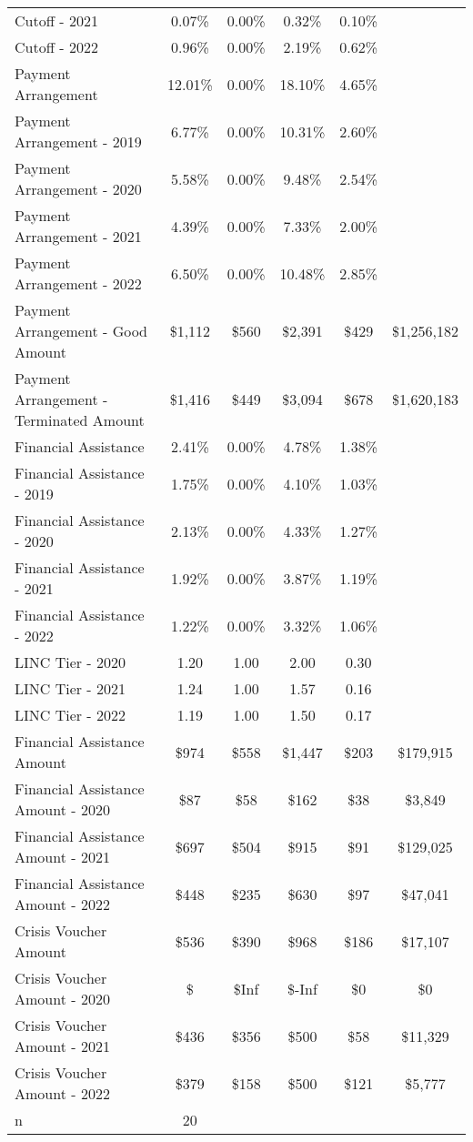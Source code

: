 \begin{tabular}{l|c|c|c|c|c}
\quad Cutoff - 2021 & 0.07\% & 0.00\% & 0.32\% & 0.10\% \\
\quad Cutoff - 2022 & 0.96\% & 0.00\% & 2.19\% & 0.62\% \\
\midrule 
Payment Arrangement & 12.01\% & 0.00\% & 18.10\% & 4.65\% \\
\quad Payment Arrangement - 2019 & 6.77\% & 0.00\% & 10.31\% & 2.60\% \\
\quad Payment Arrangement - 2020 & 5.58\% & 0.00\% & 9.48\% & 2.54\% \\
\quad Payment Arrangement - 2021 & 4.39\% & 0.00\% & 7.33\% & 2.00\% \\
\quad Payment Arrangement - 2022 & 6.50\% & 0.00\% & 10.48\% & 2.85\% \\
\quad Payment Arrangement - Good Amount & \$1,112 & \$560 & \$2,391 & \$429 & \$1,256,182 \\
\quad Payment Arrangement - Terminated Amount & \$1,416 & \$449 & \$3,094 & \$678 & \$1,620,183 \\
\midrule 
Financial Assistance & 2.41\% & 0.00\% & 4.78\% & 1.38\% \\
\quad Financial Assistance - 2019 & 1.75\% & 0.00\% & 4.10\% & 1.03\% \\
\quad Financial Assistance - 2020 & 2.13\% & 0.00\% & 4.33\% & 1.27\% \\
\quad Financial Assistance - 2021 & 1.92\% & 0.00\% & 3.87\% & 1.19\% \\
\quad Financial Assistance - 2022 & 1.22\% & 0.00\% & 3.32\% & 1.06\% \\
\midrule 
LINC Tier - 2020 & 1.20 & 1.00 & 2.00 & 0.30 \\
LINC Tier - 2021 & 1.24 & 1.00 & 1.57 & 0.16 \\
LINC Tier - 2022 & 1.19 & 1.00 & 1.50 & 0.17 \\
\midrule 
Financial Assistance Amount & \$974 & \$558 & \$1,447 & \$203 & \$179,915 \\
\quad Financial Assistance Amount - 2020 & \$87 & \$58 & \$162 & \$38 & \$3,849 \\
\quad Financial Assistance Amount - 2021 & \$697 & \$504 & \$915 & \$91 & \$129,025 \\
\quad Financial Assistance Amount - 2022 & \$448 & \$235 & \$630 & \$97 & \$47,041 \\
\midrule 
Crisis Voucher Amount & \$536 & \$390 & \$968 & \$186 & \$17,107 \\
\quad Crisis Voucher Amount - 2020 & \$ & \$Inf & \$-Inf & \$0 & \$0 \\
\quad Crisis Voucher Amount - 2021 & \$436 & \$356 & \$500 & \$58 & \$11,329 \\
\quad Crisis Voucher Amount - 2022 & \$379 & \$158 & \$500 & \$121 & \$5,777 \\
\midrule 
n & 20 &  &  &  &  \\
\midrule 
\bottomrule 
\end{tabular}
